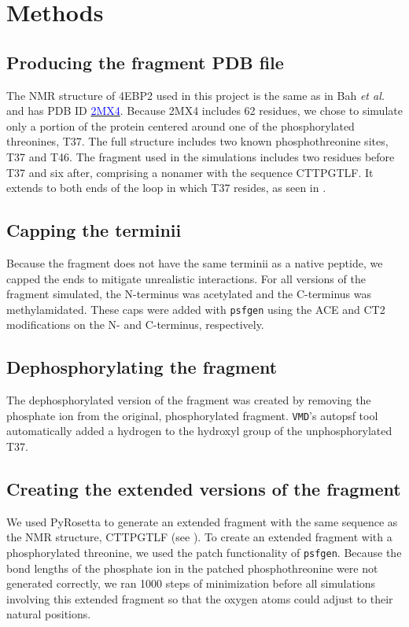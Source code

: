 \section{Methods} %
\label{sec:methods}

\subsection{Producing the fragment PDB file}
The NMR structure of 4EBP2 used in this project is the same as in Bah \textit{et al.}
and has PDB ID \href{http://www.rcsb.org/pdb/explore/explore.do?structureId=2MX4}{\textcolor{blue}{2MX4}}.
Because 2MX4 includes 62 residues, we chose to simulate only a portion of the protein centered around one of the phosphorylated threonines, T37.
The full structure includes two known phosphothreonine sites, T37 and T46.
The fragment used in the simulations includes two residues before T37 and six after, comprising a nonamer with the sequence CTTPGTLF.
It extends to both ends of the loop in which T37 resides, as seen in .


\subsection{Capping the terminii}
Because the fragment does not have the same terminii as a native peptide, we capped the ends to mitigate unrealistic interactions.
For all versions of the fragment simulated, the N-terminus was acetylated and the C-terminus was methylamidated.
These caps were added with \texttt{psfgen} using the ACE and CT2 modifications on the N- and C-terminus, respectively.

\subsection{Dephosphorylating the fragment}
The dephosphorylated version of the fragment was created by removing the phosphate ion from the original, phosphorylated fragment.
\texttt{VMD}'s autopsf tool automatically added a hydrogen to the hydroxyl group of the unphosphorylated T37.

\subsection{Creating the extended versions of the fragment}
We used PyRosetta to generate an extended fragment with the same sequence as the NMR structure, CTTPGTLF (see ).
To create an extended fragment with a phosphorylated threonine, we used the patch functionality of \texttt{psfgen}.
Because the bond lengths of the phosphate ion in the patched phosphothreonine were not generated correctly,
we ran 1000 steps of minimization before all simulations involving this extended fragment so that the oxygen atoms could adjust to their natural positions.


